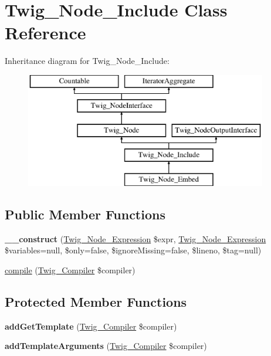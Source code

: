 \hypertarget{class_twig___node___include}{}\section{Twig\+\_\+\+Node\+\_\+\+Include Class Reference}
\label{class_twig___node___include}
Inheritance diagram for Twig\+\_\+\+Node\+\_\+\+Include\+:\begin{figure}[H]
\begin{center}
\leavevmode
\includegraphics[height=5.000000cm]{class_twig___node___include}
\end{center}
\end{figure}
\subsection*{Public Member Functions}
\begin{DoxyCompactItemize}
\item 
\hypertarget{class_twig___node___include_aba87c03dc7341434c78faeb942409ff6}{}{\bfseries \+\_\+\+\_\+construct} (\hyperlink{class_twig___node___expression}{Twig\+\_\+\+Node\+\_\+\+Expression} \$expr, \hyperlink{class_twig___node___expression}{Twig\+\_\+\+Node\+\_\+\+Expression} \$variables=null, \$only=false, \$ignore\+Missing=false, \$lineno, \$tag=null)\label{class_twig___node___include_aba87c03dc7341434c78faeb942409ff6}

\item 
\hyperlink{class_twig___node___include_a4e0faa87c3fae583620b84d3607085da}{compile} (\hyperlink{class_twig___compiler}{Twig\+\_\+\+Compiler} \$compiler)
\end{DoxyCompactItemize}
\subsection*{Protected Member Functions}
\begin{DoxyCompactItemize}
\item 
\hypertarget{class_twig___node___include_a899e31f4c948a6fd44a4ec27c4dbe5a3}{}{\bfseries add\+Get\+Template} (\hyperlink{class_twig___compiler}{Twig\+\_\+\+Compiler} \$compiler)\label{class_twig___node___include_a899e31f4c948a6fd44a4ec27c4dbe5a3}

\item 
\hypertarget{class_twig___node___include_a6006862bbfd7b8b4f132b41aba242a61}{}{\bfseries add\+Template\+Arguments} (\hyperlink{class_twig___compiler}{Twig\+\_\+\+Compiler} \$compiler)\label{class_twig___node___include_a6006862bbfd7b8b4f132b41aba242a61}

\end{DoxyCompactItemize}
